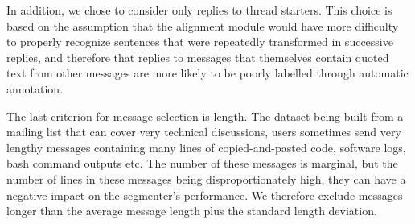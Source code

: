 In addition, we chose to consider only replies to thread starters. This choice is based on the assumption that the alignment module would have more difficulty to properly recognize sentences that were repeatedly transformed in successive replies, and therefore that replies to messages that themselves contain quoted text from other messages are more likely to be poorly labelled through automatic annotation.

The last criterion for message selection is length. The dataset being built from a mailing list that can cover very technical discussions, users sometimes send very lengthy messages containing many lines of copied-and-pasted code, software logs, bash command outputs etc. The number of these messages is marginal, but the number of lines in these messages being disproportionately high, they can have a negative impact on the segmenter's performance. We therefore exclude messages longer than the average message length plus the standard length deviation.